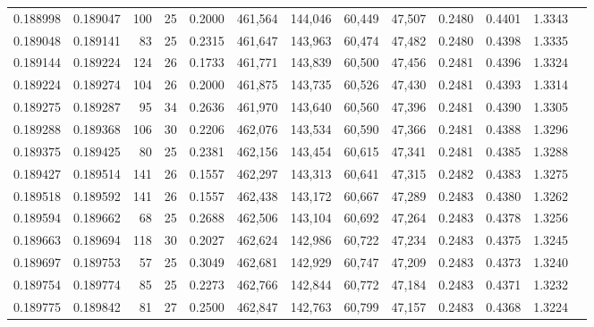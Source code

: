 \begin{tabular}{rrrrrrrrrrrrr}
0.188998 & 0.189047 & 100 &  25 &                                     0.2000 & 461,564 & 144,046 &  60,449 &  47,507 & 0.2480 & 0.4401 & 1.3343 \\
0.189048 & 0.189141 &  83 &  25 &                                     0.2315 & 461,647 & 143,963 &  60,474 &  47,482 & 0.2480 & 0.4398 & 1.3335 \\
0.189144 & 0.189224 & 124 &  26 &                                     0.1733 & 461,771 & 143,839 &  60,500 &  47,456 & 0.2481 & 0.4396 & 1.3324 \\
0.189224 & 0.189274 & 104 &  26 &                                     0.2000 & 461,875 & 143,735 &  60,526 &  47,430 & 0.2481 & 0.4393 & 1.3314 \\
0.189275 & 0.189287 &  95 &  34 &                                     0.2636 & 461,970 & 143,640 &  60,560 &  47,396 & 0.2481 & 0.4390 & 1.3305 \\
0.189288 & 0.189368 & 106 &  30 &                                     0.2206 & 462,076 & 143,534 &  60,590 &  47,366 & 0.2481 & 0.4388 & 1.3296 \\
0.189375 & 0.189425 &  80 &  25 &                                     0.2381 & 462,156 & 143,454 &  60,615 &  47,341 & 0.2481 & 0.4385 & 1.3288 \\
0.189427 & 0.189514 & 141 &  26 &                                     0.1557 & 462,297 & 143,313 &  60,641 &  47,315 & 0.2482 & 0.4383 & 1.3275 \\
0.189518 & 0.189592 & 141 &  26 &                                     0.1557 & 462,438 & 143,172 &  60,667 &  47,289 & 0.2483 & 0.4380 & 1.3262 \\
0.189594 & 0.189662 &  68 &  25 &                                     0.2688 & 462,506 & 143,104 &  60,692 &  47,264 & 0.2483 & 0.4378 & 1.3256 \\
0.189663 & 0.189694 & 118 &  30 &                                     0.2027 & 462,624 & 142,986 &  60,722 &  47,234 & 0.2483 & 0.4375 & 1.3245 \\
0.189697 & 0.189753 &  57 &  25 &                                     0.3049 & 462,681 & 142,929 &  60,747 &  47,209 & 0.2483 & 0.4373 & 1.3240 \\
0.189754 & 0.189774 &  85 &  25 &                                     0.2273 & 462,766 & 142,844 &  60,772 &  47,184 & 0.2483 & 0.4371 & 1.3232 \\
0.189775 & 0.189842 &  81 &  27 &                                     0.2500 & 462,847 & 142,763 &  60,799 &  47,157 & 0.2483 & 0.4368 & 1.3224 \\

\end{tabular}
